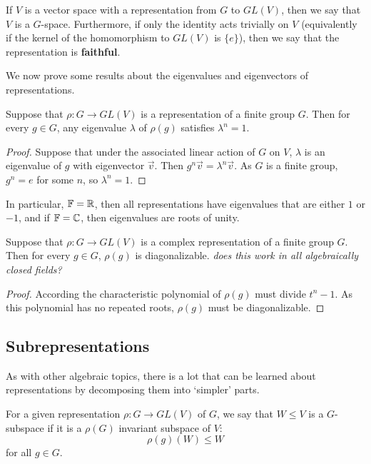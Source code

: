 \documentclass[a4paper]{article}
\begin{document}
If $V$ is a vector space with a representation from $G$ to $GL(V)$, then we say that $V$ is a $G$-space. Furthermore, if only the identity acts trivially on $V$ (equivalently if the kernel of the homomorphism to $GL(V)$ is $\{e\}$), then we say that the representation is \textbf{faithful}.

We now prove some results about the eigenvalues and eigenvectors of representations.

\begin{lemma}
    Suppose that $\rho : G \to GL(V)$ is a representation of a finite group $G$. Then for every $g \in G$, any eigenvalue $\lambda$ of $\rho(g)$ satisfies $\lambda^n = 1$.
\end{lemma} 

\begin{proof}
    Suppose that under the associated linear action of $G$ on $V$, $\lambda$ is an eigenvalue of $g$ with eigenvector $\vec{v}$. Then $g^n\vec{v} = \lambda^n \vec{v}$. As $G$ is a finite group, $g^n = e$ for some $n$, so $\lambda^n = 1$.
\end{proof}
In particular, $\mathbb{F} = \mathbb{R}$, then all representations have eigenvalues that are either $1$ or $-1$, and if $\mathbb{F} = \mathbb{C}$, then eigenvalues are roots of unity.

\begin{cor}
    Suppose that $\rho : G \to GL(V)$ is a complex representation of a finite group $G$. Then for every $g \in G$, $\rho(g)$ is diagonalizable. \textit{does this work in all algebraically closed fields?} 
\end{cor} 

\begin{proof}
    According the characteristic polynomial of $\rho(g)$ must divide $t^n - 1$. As this polynomial has no repeated roots, $\rho(g)$ must be diagonalizable.
\end{proof}

\subsection{Subrepresentations}
As with other algebraic topics, there is a lot that can be learned about representations by decomposing them into `simpler' parts.

\begin{defi}[G-subspace]
    For a given representation $\rho: G \to GL(V)$ of $G$, we say that $W \leq V$ is a $G$-subspace if it is a $\rho(G)$ invariant subspace of $V$: $$\rho(g)(W) \leq W$$ for all $g \in G$.
\end{defi}
\end{document}
